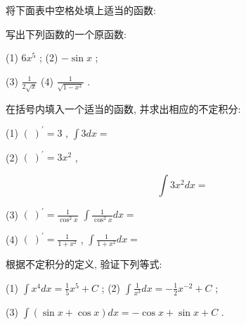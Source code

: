 \documentclass[lang=cn,newtx,12pt,scheme=chinese]{elegantbook}
\begin{document}
\begin{problemset}[练习]

\item 将下面表中空格处填上适当的函数:

\begin{center}
\end{center}

\item 写出下列函数的一个原函数:

(1) \(6{x}^{5}\) ; (2) \(- \sin x\) ;

(3) \(\frac{1}{2\sqrt{x}}\) (4) \(\frac{1}{\sqrt{1 - {x}^{2}}}\) .

\item 在括号内填入一个适当的函数, 并求出相应的不定积分:

(1) \({\left( \;\right) }^{\prime } = 3\) , \(\int {3dx} =\)

(2) \({\left( \;\right) }^{\prime } = 3{x}^{2}\) ,

\[
\int 3{x}^{2}{dx} =
\]

(3) \({\left( \;\right) }^{\prime } = \frac{1}{{\cos }^{2}x}\) \(\int \frac{1}{{\cos }^{2}x}{dx} =\)

(4) \({\left( \;\right) }^{\prime } = \frac{1}{1 + {x}^{2}}\) , \(\int \frac{1}{1 + {x}^{2}}{dx} =\)

\item 根据不定积分的定义, 验证下列等式:

(1) \(\int {x}^{4}{dx} = \frac{1}{5}{x}^{5} + C\) ; (2) \(\int \frac{1}{{x}^{3}}{dx} = - \frac{1}{2}{x}^{-2} + C\) ;

(3) \(\int \left( {\sin x + \cos x}\right) {dx} = - \cos x + \sin x + C\) .

\end{problemset}
\end{document}
